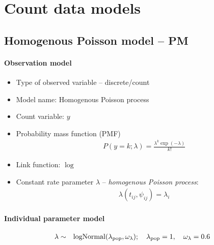 \section{Count data models}
\label{sec:countDataModels}


\subsection{Homogenous Poisson model -- PM}
\label{subsec:PMmodel}

\paragraph{Observation model}

\begin{itemize}
\item
Type of observed variable -- discrete/count
\item
Model name: Homogenous Poisson process
\item
Count variable: $y$
\item
Probability mass function (PMF)
\begin{eqnarray}
&& P(y=k; \lambda) = \frac{\lambda^k \exp(-\lambda)}{k!} \nonumber
\end{eqnarray}
\item
Link function: $\log$
\item
Constant rate parameter $\lambda$ -- \emph{homogenous Poisson process}:
\begin{eqnarray}
&& \lambda(t_{ij}, \psi_{ij}) = \lambda_{i} \nonumber
\end{eqnarray}
\end{itemize}


\paragraph{Individual parameter model}
\begin{eqnarray}
\lambda & \sim& \mbox{logNormal}(\lambda_{\rm pop}, \omega_{\lambda});  \quad \lambda_{\rm pop}=1,\quad \omega_{\lambda}=0.6 \nonumber
\end{eqnarray}


